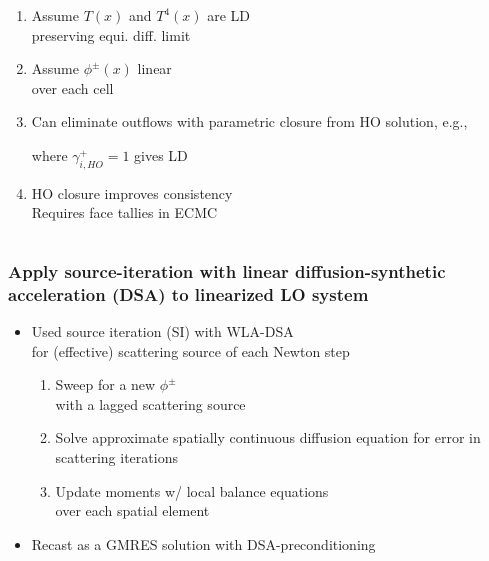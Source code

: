 \documentclass[xcolor=dvipsnames,hyperref={pdfpagelabels=false},unknownkeysallowed]{beamer}
\newcommand{\colb}[1]{{\color{blue} #1}}
\newcommand{\colG}[1]{{\color{Gray!110} #1}}
\newlength{\wideitemsep}
\let\olditem\item
\renewcommand{\item}{\setlength{\itemsep}{\wideitemsep}\olditem}
\newcommand{\mom}[1]{\langle #1 \rangle}
\begin{document}
\begin{frame}
\begin{columns}
\begin{column}{0.75\linewidth}
    \addtolength{\wideitemsep}{0.11in}
    {        \fontsize{11.0pt}{10.2pt}\selectfont
    \begin{enumerate}
        \item Assume $T(x)$ and $T^4(x)$ are LD \\
            \colG{preserving equi. diff. limit}
        \item Assume $\phi^{\pm}(x)$ linear  \\ 
            \colG{over each cell}
        \item Can eliminate outflows with parametric closure from HO solution, e.g., \vspace{0.1in}
            \begin{center}{\textcolor{Gray}{%
                    \fbox{ {\color{black} $\displaystyle  
            \phi_{i+1/2}^+ = \colb{\gamma_{i,HO}^+}\mom{\phi}_{a,i}^+ + \mom{\phi}_{x,i}^+$}}}}
            \end{center}
            \colG{where  {$\gamma_{i,HO}^+ = 1$ gives LD}}
        \item[] HO closure improves consistency
            \\ \colG{Requires face tallies in ECMC}
       \end{enumerate}
   }
    \end{column}
\end{columns}
\end{frame}

\begin{frame}
    \frametitle{Apply source-iteration with linear diffusion-synthetic acceleration (DSA)
    to linearized LO system}
    \begin{itemize}
        \item[] Used source iteration (SI) with WLA-DSA  \\ \colG{for (effective) scattering source
            of each Newton step}
            \vspace{0.1in}
            \begin{enumerate}
                \item Sweep for a new $\phi^{\pm}$ \\ \colG{with a lagged scattering
                    source}
                \item Solve approximate \colb{spatially continuous} diffusion equation for error in
                    scattering iterations
                \item Update moments w/ local balance equations 
                    \\ \colG{over each spatial element}
            \end{enumerate}
            \pause
         \item[] Recast as a GMRES solution with DSA-preconditioning
     \end{itemize}
\end{frame}
\end{document}

